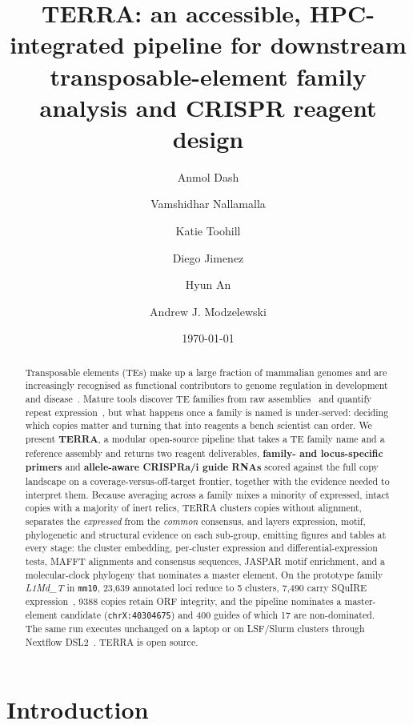 \documentclass[11pt]{article}
\title{\textbf{TERRA}: an accessible, HPC-integrated pipeline for downstream
transposable-element family analysis and CRISPR reagent design}
\author{Anmol Dash \and Vamshidhar Nallamalla \and Katie Toohill \and Diego Jimenez \and Hyun An \and Andrew J. Modzelewski}
\date{\today}
\providecommand{\phyloNIntact}{9388}
\providecommand{\phyloMasterName}{\texttt{chrX:40304675}}
\providecommand{\grnaOTNGuides}{400}
\providecommand{\grnaOTNFrontier}{17}
\newcommand{\protoFamily}{L1Md\_T}
\newcommand{\protoAssembly}{mm10}
\newcommand{\protoLoci}{23,639}
\newcommand{\protoClusters}{\csClusters}
\newcommand{\protoExprLoci}{7,490}
\newcommand{\protoIntact}{\phyloNIntact}
\newcommand{\protoMaster}{\phyloMasterName}
\newcommand{\protoGuides}{\grnaOTNGuides}
\newcommand{\protoFrontier}{\grnaOTNFrontier}
\providecommand{\csClusters}{5}\providecommand{\csNoisePct}{7.2}
\begin{document}
\maketitle

\begin{abstract}
\noindent
Transposable elements (TEs) make up a large fraction of mammalian genomes and are
increasingly recognised as functional contributors to genome regulation in development and
disease~\citep{bourque2018}. Mature tools discover TE families from raw
assemblies~\citep{flynn2020} and quantify repeat
expression~\citep{yang2019squire,jin2015tetranscripts,bendall2019telescope}, but what happens
once a family is named is under-served: deciding which copies matter and turning that into
reagents a bench scientist can order. We present \textbf{TERRA}, a modular open-source
pipeline that takes a TE family name and a reference assembly and returns two reagent
deliverables, \textbf{family- and locus-specific primers} and \textbf{allele-aware CRISPRa/i
guide RNAs} scored against the full copy landscape on a coverage-versus-off-target frontier,
together with the evidence needed to interpret them. Because averaging across a family mixes a
minority of expressed, intact copies with a majority of inert relics, TERRA clusters copies
without alignment, separates the \emph{expressed} from the \emph{common} consensus, and layers
expression, motif, phylogenetic and structural evidence on each sub-group, emitting figures and
tables at every stage: the cluster embedding, per-cluster expression and differential-expression
tests, MAFFT alignments and consensus sequences, JASPAR motif enrichment, and a molecular-clock
phylogeny that nominates a master element. On the prototype family \emph{\protoFamily} in
\texttt{\protoAssembly}, \protoLoci{} annotated loci reduce to \protoClusters{} clusters,
\protoExprLoci{} carry SQuIRE expression~\citep{yang2019squire}, \protoIntact{} copies retain
ORF integrity, and the pipeline nominates a master-element candidate (\protoMaster) and
\protoGuides{} guides of which \protoFrontier{} are non-dominated. The same run executes
unchanged on a laptop or on LSF/Slurm clusters through Nextflow
DSL2~\citep{ditommaso2017,ewels2020}. TERRA is open source.
\end{abstract}

\section{Introduction}
\end{document}
